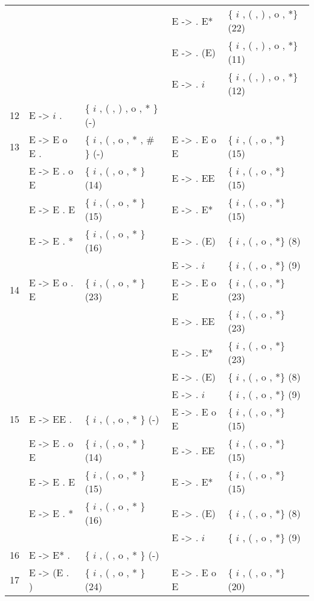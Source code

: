 \begin{center}
\begin{longtable}{c|ll|ll}
 &              &                & E ->  . E*  & \{ $i$ , ( , ) , o , *\} (22)\\
 &              &                & E ->  . (E) & \{ $i$ , ( , ) , o , *\} (11)\\
 &              &                & E ->  . $i$   & \{ $i$ , ( , ) , o , *\} (12)\\
 \hline
12 &   E -> $i$ .    & \{ $i$ , ( , ) , o , * \} (-)\\
\hline
13 &   E -> E o E .  & \{ $i$ , ( , o , * , \# \} (-) & E ->  . E o E & \{ $i$ , ( , o , *\} (15)\\
 &   E -> E . o E & \{ $i$ , ( , o , *   \} (14) & E ->  . EE  & \{ $i$ , ( , o , *\} (15)\\
 &   E -> E . E  & \{ $i$ , ( , o , *   \} (15) & E ->  . E*  & \{ $i$ , ( , o , *\} (15)\\
 &   E -> E . *  & \{ $i$ , ( , o , *   \} (16) & E ->  . (E) & \{ $i$ , ( , o , *\} (8)\\
 &              &                & E ->  . $i$   & \{ $i$ , ( , o , *\} (9)\\
\hline
14 &   E -> E o . E & \{ $i$ , ( , o , *   \} (23) & E ->  . E o E & \{ $i$ , ( , o , *\} (23)\\
 &              &                & E ->  . EE  & \{ $i$ , ( , o , *\} (23)\\
 &              &                & E ->  . E*  & \{ $i$ , ( , o , *\} (23)\\
 &              &                & E ->  . (E) & \{ $i$ , ( , o , *\} (8)\\
 &              &                & E ->  . $i$   & \{ $i$ , ( , o , *\} (9)\\
\hline
15 &   E -> EE .   & \{ $i$ , ( , o , * \} (-)   & E ->  . E o E & \{ $i$ , ( , o , *\} (15)\\
 &   E -> E . o E & \{ $i$ , ( , o , * \} (14)   & E ->  . EE  & \{ $i$ , ( , o , *\} (15)\\
 &   E -> E . E  & \{ $i$ , ( , o , * \} (15)   & E ->  . E*  & \{ $i$ , ( , o , *\} (15)\\
 &   E -> E . *  & \{ $i$ , ( , o , * \} (16)   & E ->  . (E) & \{ $i$ , ( , o , *\} (8)\\
 &              &                & E ->  . $i$   & \{ $i$ , ( , o , *\} (9)\\
\hline
16 &   E -> E* .   & \{ $i$ , ( , o , * \} (-)\\
\hline
17 &   E -> (E . ) & \{ $i$ , ( , o , *   \} (24) & E ->  . E o E & \{ $i$ , ( , o , *\} (20)\\

\end{longtable}
\end{center}
